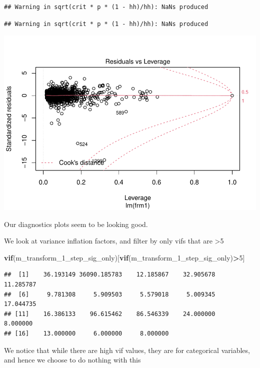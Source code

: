 \documentclass[
]{article}
\newenvironment{Shaded}{\begin{snugshade}}{\end{snugshade}}
\newcommand{\DecValTok}[1]{\textcolor[rgb]{0.00,0.00,0.81}{#1}}
\newcommand{\KeywordTok}[1]{\textcolor[rgb]{0.13,0.29,0.53}{\textbf{#1}}}
\newcommand{\NormalTok}[1]{#1}
\newcommand{\OperatorTok}[1]{\textcolor[rgb]{0.81,0.36,0.00}{\textbf{#1}}}
\begin{document}
\begin{verbatim}
## Warning in sqrt(crit * p * (1 - hh)/hh): NaNs produced
\end{verbatim}

\begin{verbatim}
## Warning in sqrt(crit * p * (1 - hh)/hh): NaNs produced
\end{verbatim}

\includegraphics{Project_files/figure-latex/unnamed-chunk-42-4.pdf}

Our diagnostics plots seem to be looking good.

We look at variance inflation factors, and filter by only vifs that are \textgreater5

\begin{Shaded}
\begin{Highlighting}[]
\KeywordTok{vif}\NormalTok{(m_transform_}\DecValTok{1}\NormalTok{_step_sig_only)[}\KeywordTok{vif}\NormalTok{(m_transform_}\DecValTok{1}\NormalTok{_step_sig_only)}\OperatorTok{>}\DecValTok{5}\NormalTok{]}
\end{Highlighting}
\end{Shaded}

\begin{verbatim}
##  [1]    36.193149 36090.185783    12.185867    32.905678    11.285787
##  [6]     9.781308     5.909503     5.579018     5.009345    17.044735
## [11]    16.386133    96.615462    86.546339    24.000000     8.000000
## [16]    13.000000     6.000000     8.000000
\end{verbatim}

We notice that while there are high vif values, they are for categorical variables, and hence we choose to do nothing with this
\end{document}
